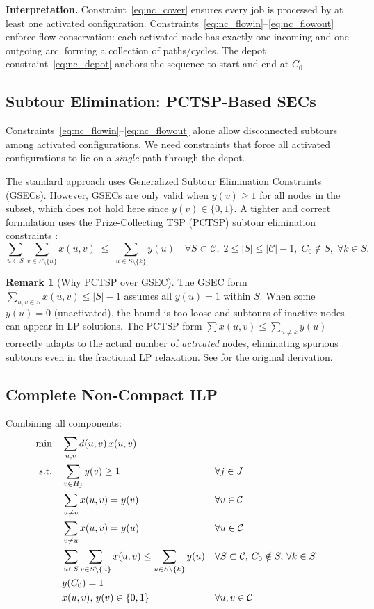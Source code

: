 \documentclass[11pt,a4paper]{article}
\theoremstyle{plain}
\theoremstyle{definition}
\newtheorem{remark}[theorem]{Remark}
\begin{document}
\noindent\textbf{Interpretation.}
Constraint~\eqref{eq:nc_cover} ensures every job is processed by at least one
activated configuration. Constraints~\eqref{eq:nc_flowin}--\eqref{eq:nc_flowout}
enforce flow conservation: each activated node has exactly one incoming and one
outgoing arc, forming a collection of paths/cycles. The depot constraint~\eqref{eq:nc_depot}
anchors the sequence to start and end at $C_0$.

\subsection{Subtour Elimination: PCTSP-Based SECs}

Constraints~\eqref{eq:nc_flowin}--\eqref{eq:nc_flowout} alone allow disconnected
subtours among activated configurations. We need constraints that force all
activated configurations to lie on a \emph{single} path through the depot.

The standard approach uses Generalized Subtour Elimination Constraints (GSECs).
However, GSECs are only valid when $y(v) \ge 1$ for all nodes in the subset,
which does not hold here since $y(v) \in \{0,1\}$. A tighter and correct
formulation uses the Prize-Collecting TSP (PCTSP) subtour elimination constraints
\cite{Balas1989}:
\[
  \sum_{u \in S}\sum_{v \in S \setminus \{u\}} x(u,v)
  \;\le\; \sum_{u \in S \setminus \{k\}} y(u)
  \quad \forall S \subset \mathcal{C},\; 2 \le |S| \le |\mathcal{C}|-1,\;
  C_0 \notin S,\; \forall k \in S.
  \label{eq:nc_pctsp}
\]

\begin{remark}[Why PCTSP over GSEC]
The GSEC form $\sum_{u,v \in S} x(u,v) \le |S|-1$ assumes all $y(u)=1$ within
$S$. When some $y(u)=0$ (unactivated), the bound is too loose and subtours of
inactive nodes can appear in LP solutions. The PCTSP form $\sum x(u,v) \le
\sum_{u \ne k} y(u)$ correctly adapts to the actual number of \emph{activated}
nodes, eliminating spurious subtours even in the fractional LP relaxation.
See \cite{Balas1989} for the original derivation.
\end{remark}

\subsection{Complete Non-Compact ILP}

Combining all components:
\begin{align}
\min \quad & \sum_{u,v} d(u,v)\, x(u,v) \notag\\
\text{s.t.}\quad
& \sum_{v \in H_j} y(v) \ge 1 && \forall j \in J \notag\\
& \sum_{u \ne v} x(u,v) = y(v) && \forall v \in \mathcal{C} \notag\\
& \sum_{v \ne u} x(u,v) = y(u) && \forall u \in \mathcal{C} \notag\\
& \sum_{u \in S}\sum_{v \in S \setminus \{u\}} x(u,v)
  \le \sum_{u \in S \setminus \{k\}} y(u)
  && \forall S \subset \mathcal{C},\, C_0 \notin S,\, \forall k \in S \notag\\
& y(C_0) = 1 \notag\\
& x(u,v),\, y(v) \in \{0,1\} && \forall u,v \in \mathcal{C} \notag
\end{align}
\end{document}
